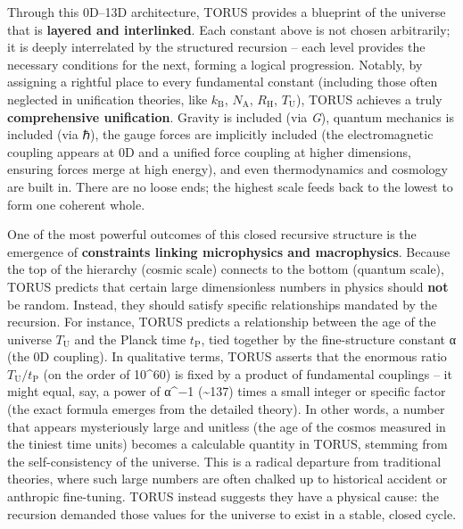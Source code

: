 \documentclass[]{article}
\newcommand{\subscript}[1]{\ensuremath{_{\mathrm{#1}}}}
\begin{document}
Through this 0D--13D architecture, TORUS provides a blueprint of the
universe that is \textbf{layered and interlinked}. Each constant above
is not chosen arbitrarily; it is deeply interrelated by the structured
recursion -- each level provides the necessary conditions for the next,
forming a logical progression. Notably, by assigning a rightful place to
every fundamental constant (including those often neglected in
unification theories, like
$k\subscript{B}$,
$N\subscript{A}$,
$R\subscript{H}$,
$T\subscript{U}$),
TORUS achieves a truly \textbf{comprehensive unification}. Gravity is
included (via \emph{G}), quantum mechanics is included (via ℏ), the
gauge forces are implicitly included (the electromagnetic coupling
appears at 0D and a unified force coupling at higher dimensions,
ensuring forces merge at high energy), and even thermodynamics and
cosmology are built in. There are no loose ends; the highest scale feeds
back to the lowest to form one coherent whole.

One of the most powerful outcomes of this closed recursive structure is
the emergence of \textbf{constraints linking microphysics and
macrophysics}. Because the top of the hierarchy (cosmic scale) connects
to the bottom (quantum scale), TORUS predicts that certain large
dimensionless numbers in physics should \textbf{not} be random. Instead,
they should satisfy specific relationships mandated by the recursion.
For instance, TORUS predicts a relationship between the age of the
universe
$T\subscript{U}$ and
the Planck time
$t\subscript{P}$, tied
together by the fine-structure constant α (the 0D coupling). In
qualitative terms, TORUS asserts that the enormous ratio
$T\subscript{U} /
t\subscript{P}$ (on the
order of 10\^{}60) is fixed by a product of fundamental couplings -- it
might equal, say, a power of α\^{}−1 (\textasciitilde{}137) times a
small integer or specific factor (the exact formula emerges from the
detailed theory). In other words, a number that appears mysteriously
large and unitless (the age of the cosmos measured in the tiniest time
units) becomes a calculable quantity in TORUS, stemming from the
self-consistency of the universe. This is a radical departure from
traditional theories, where such large numbers are often chalked up to
historical accident or anthropic fine-tuning. TORUS instead suggests
they have a physical cause: the recursion demanded those values for the
universe to exist in a stable, closed cycle.
\end{document}
